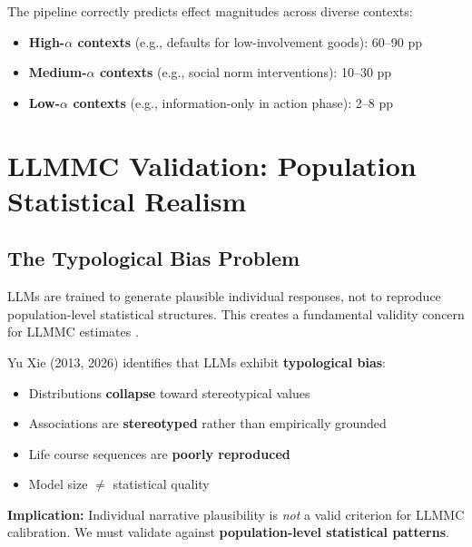 The pipeline correctly predicts effect magnitudes across diverse contexts:
\begin{itemize}[nosep]
\item \textbf{High-$\alpha$ contexts} (e.g., defaults for low-involvement goods): 60--90 pp
\item \textbf{Medium-$\alpha$ contexts} (e.g., social norm interventions): 10--30 pp
\item \textbf{Low-$\alpha$ contexts} (e.g., information-only in action phase): 2--8 pp
\end{itemize}



\section{LLMMC Validation: Population Statistical Realism}
\label{sec:iii-validation-psr}

\subsection{The Typological Bias Problem}

LLMs are trained to generate plausible individual responses, not to reproduce
population-level statistical structures. This creates a fundamental validity concern
for LLMMC estimates \citep{PAP-xie2013population}.

\begin{tcolorbox}[colback=red!5!white, colframe=red!75!black,
    title=Warning: Typological Bias in LLMs]
Yu Xie (2013, 2026) identifies that LLMs exhibit \textbf{typological bias}:
\begin{itemize}[nosep]
\item Distributions \textbf{collapse} toward stereotypical values
\item Associations are \textbf{stereotyped} rather than empirically grounded
\item Life course sequences are \textbf{poorly reproduced}
\item Model size $\neq$ statistical quality
\end{itemize}

\textbf{Implication:} Individual narrative plausibility is \emph{not} a valid criterion
for LLMMC calibration. We must validate against \textbf{population-level statistical patterns}.
\end{tcolorbox}

